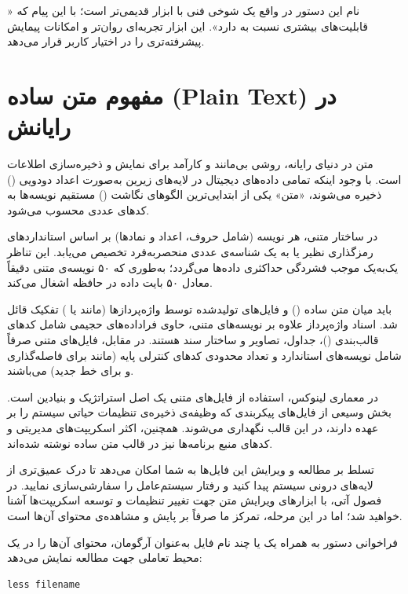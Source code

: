 نام این دستور در واقع یک شوخی فنی با ابزار قدیمی‌تر  است؛ با این پیام که « قابلیت‌های بیشتری نسبت به  دارد». این ابزار تجربه‌ای روان‌تر و امکانات پیمایش پیشرفته‌تری را در اختیار کاربر قرار می‌دهد.

\section{مفهوم متن ساده (Plain Text) در رایانش}

متن در دنیای رایانه، روشی بی‌مانند و کارآمد برای نمایش و ذخیره‌سازی اطلاعات است. با وجود اینکه تمامی داده‌های دیجیتال در لایه‌های زیرین به‌صورت اعداد دودویی () ذخیره می‌شوند، «متن» یکی از ابتدایی‌ترین الگوهای نگاشت () مستقیم نویسه‌ها به کدهای عددی محسوب می‌شود.

در ساختار متنی، هر نویسه (شامل حروف، اعداد و نمادها) بر اساس استانداردهای رمزگذاری نظیر  یا  به یک شناسه‌ی عددی منحصربه‌فرد تخصیص می‌یابد. این تناظر یک‌به‌یک موجب فشردگی حداکثری داده‌ها می‌گردد؛ به‌طوری که ۵۰ نویسه‌ی متنی دقیقاً معادل ۵۰ بایت داده در حافظه اشغال می‌کند.

باید میان متن ساده () و فایل‌های تولیدشده توسط واژه‌پردازها (مانند  یا ) تفکیک قائل شد. اسناد واژه‌پرداز علاوه بر نویسه‌های متنی، حاوی فراداده‌های حجیمی شامل کدهای قالب‌بندی ()، جداول، تصاویر و ساختار سند هستند. در مقابل، فایل‌های متنی صرفاً شامل نویسه‌های استاندارد و تعداد محدودی کدهای کنترلی پایه (مانند  برای فاصله‌گذاری و  برای خط جدید) می‌باشند.

در معماری لینوکس، استفاده از فایل‌های متنی یک اصل استراتژیک و بنیادین است. بخش وسیعی از فایل‌های پیکربندی که وظیفه‌ی ذخیره‌ی تنظیمات حیاتی سیستم را بر عهده دارند، در این قالب نگهداری می‌شوند. همچنین، اکثر اسکریپت‌های مدیریتی و کدهای منبع برنامه‌ها نیز در قالب متن ساده نوشته شده‌اند.

تسلط بر مطالعه و ویرایش این فایل‌ها به شما امکان می‌دهد تا درک عمیق‌تری از لایه‌های درونی سیستم پیدا کنید و رفتار سیستم‌عامل را سفارشی‌سازی نمایید. در فصول آتی، با ابزارهای ویرایش متن جهت تغییر تنظیمات و توسعه اسکریپت‌ها آشنا خواهید شد؛ اما در این مرحله، تمرکز ما صرفاً بر پایش و مشاهده‌ی محتوای آن‌ها است.

فراخوانی دستور  به همراه یک یا چند نام فایل به‌عنوان آرگومان، محتوای آن‌ها را در یک محیط تعاملی جهت مطالعه نمایش می‌دهد:

\begin{latin}
\begin{lstlisting}
less filename
\end{lstlisting}
\end{latin}


